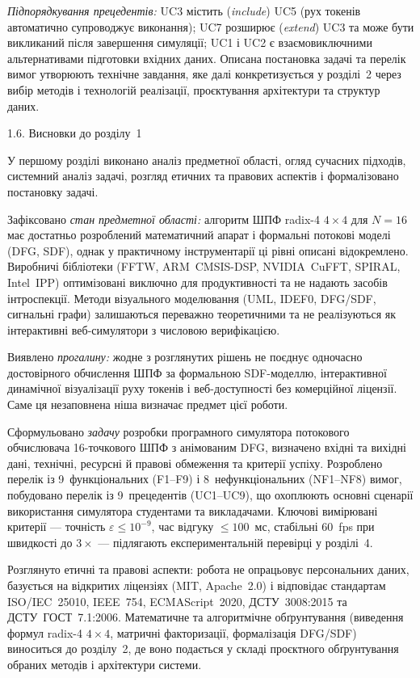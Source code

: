\emph{Підпорядкування прецедентів:} UC3 містить (\emph{include}) UC5
(рух токенів автоматично супроводжує виконання); UC7 розширює
(\emph{extend}) UC3 та може бути викликаний після завершення симуляції;
UC1 і UC2 є взаємовиключними альтернативами підготовки вхідних даних.
Описана постановка задачі та перелік вимог утворюють технічне завдання,
яке далі конкретизується у розділі~2 через вибір методів і технологій
реалізації, проєктування архітектури та структур даних.

\protect{}\label{_Toc229682910}{}1.6. Висновки до розділу~1

У першому розділі виконано аналіз предметної області, огляд сучасних
підходів, системний аналіз задачі, розгляд етичних та правових аспектів
і формалізовано постановку задачі.

Зафіксовано \emph{стан предметної області:} алгоритм ШПФ radix-4
\(4 \times 4\) для \(N = 16\) має достатньо розроблений математичний
апарат і формальні потокові моделі (DFG, SDF), однак у практичному
інструментарії ці рівні описані відокремлено. Виробничі бібліотеки
(FFTW, ARM~CMSIS-DSP, NVIDIA~CuFFT, SPIRAL, Intel~IPP) оптимізовані
виключно для продуктивності та не надають засобів інтроспекції. Методи
візуального моделювання (UML, IDEF0, DFG/SDF, сигнальні графи)
залишаються переважно теоретичними та не реалізуються як інтерактивні
веб-симулятори з числовою верифікацією.

Виявлено \emph{прогалину:} жодне з розглянутих рішень не поєднує
одночасно достовірного обчислення ШПФ за формальною SDF-моделлю,
інтерактивної динамічної візуалізації руху токенів і веб-доступності без
комерційної ліцензії. Саме ця незаповнена ніша визначає предмет цієї
роботи.

Сформульовано \emph{задачу} розробки програмного симулятора потокового
обчислювача 16-точкового ШПФ з анімованим DFG, визначено вхідні та
вихідні дані, технічні, ресурсні й правові обмеження та критерії успіху.
Розроблено перелік із 9~функціональних (F1--F9) і 8~нефункціональних
(NF1--NF8) вимог, побудовано перелік із 9~прецедентів (UC1--UC9), що
охоплюють основні сценарії використання симулятора студентами та
викладачами. Ключові вимірювані критерії --- точність
\(\varepsilon \leq 10^{- 9}\), час відгуку \(\leq 100\)~мс, стабільні
60~fps при швидкості до \(3 \times\) --- підлягають експериментальній
перевірці у розділі~4.

Розглянуто етичні та правові аспекти: робота не опрацьовує персональних
даних, базується на відкритих ліцензіях (MIT, Apache~2.0) і відповідає
стандартам ISO/IEC~25010, IEEE~754, ECMAScript~2020, ДСТУ~3008:2015 та
ДСТУ~ГОСТ~7.1:2006. Математичне та алгоритмічне обґрунтування (виведення
формул radix-4 \(4 \times 4\), матричні факторизації, формалізація
DFG/SDF) виноситься до розділу~2, де воно подається у складі проєктного
обґрунтування обраних методів і архітектури системи.
